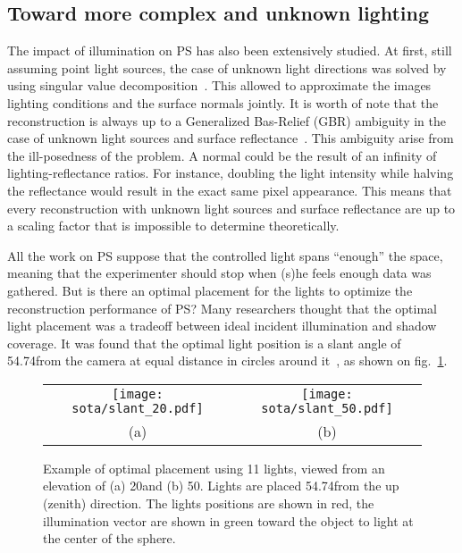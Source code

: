 \subsection{Toward more complex and unknown lighting}
The impact of illumination on PS has also been extensively studied. At first, still assuming point light sources, the case of unknown light directions was solved by using singular value decomposition~\cite{Hayakawa1994}. This allowed to approximate the images lighting conditions and the surface normals jointly. It is worth of note that the reconstruction is always up to a Generalized Bas-Relief (GBR) ambiguity in the case of unknown light sources and surface reflectance~\cite{Belhumeur1999}. This ambiguity arise from the ill-posedness of the problem. A normal could be the result of an infinity of lighting-reflectance ratios. For instance, doubling the light intensity while halving the reflectance would result in the exact same pixel appearance. This means that every reconstruction with unknown light sources and surface reflectance are up to a scaling factor that is impossible to determine theoretically.

All the work on PS suppose that the controlled light spans ``enough'' the space, meaning that the experimenter should stop when (s)he feels enough data was gathered. But is there an optimal placement for the lights to optimize the reconstruction performance of PS? Many researchers thought that the optimal light placement was a tradeoff between ideal incident illumination and shadow coverage. It was found that the optimal light position is a slant angle of 54.74\degree from the camera at equal distance in circles around it~\cite{spence-iwtas-03,drbohlav-iccv-05}, as shown on fig.~\ref{fig:sota-optimalplacement}.

\begin{figure}
\centering
\begin{tabular}{cc}
\texttt{[image: sota/slant\_20.pdf]} &
\texttt{[image: sota/slant\_50.pdf]} \\
(a) & (b)
\end{tabular}
\caption{Example of optimal placement using 11 lights, viewed from an elevation of (a) 20\degree and (b) 50\degree. Lights are placed 54.74\degree from the up (zenith) direction. The lights positions are shown in red, the illumination vector are shown in green toward the object to light at the center of the sphere.}
\label{fig:sota-optimalplacement}
\end{figure}

